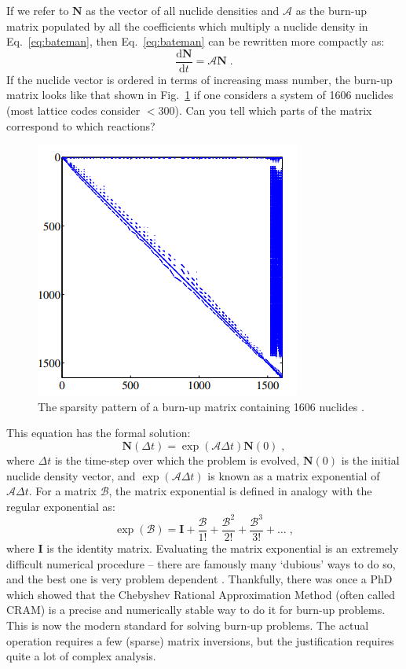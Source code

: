 \documentclass{article}
\begin{document}
If we refer to $\mathbf{N}$ as the vector of all nuclide densities and $\mathcal{A}$ as the burn-up matrix populated by all the coefficients which multiply a nuclide density in Eq.~\eqref{eq:bateman}, then Eq.~\eqref{eq:bateman} can be rewritten more compactly as:
\begin{equation}
    \frac{\mathrm{d}\mathbf{N}}{\mathrm{d}t} = \mathcal{A}\mathbf{N}\;\mathrm{.}
\end{equation}
If the nuclide vector is ordered in terms of increasing mass number, the burn-up matrix looks like that shown in Fig.~\ref{fig:matrix} if one considers a system of 1606 nuclides (most lattice codes consider $<$300). Can you tell which parts of the matrix correspond to which reactions? 

\begin{figure}[h!]
	\centering
	\includegraphics[scale=0.95]{./images/burnup_sparsity.png} 
	\caption{The sparsity pattern of a burn-up matrix containing 1606 nuclides \cite{Pusa}.} 
	\label{fig:matrix}
\end{figure}

This equation has the formal solution:
\begin{equation}
    \mathbf{N}(\Delta t) = \exp\left(\mathcal{A}\Delta t\right)\mathbf{N}(0)\;\mathrm{,}
\end{equation}
where $\Delta t$ is the time-step over which the problem is evolved, $\mathbf{N}(0)$ is the initial nuclide density vector, and $\exp\left(\mathcal{A}\Delta t\right)$ is known as a matrix exponential of $\mathcal{A}\Delta t$. For a matrix $\mathcal{B}$, the matrix exponential is defined in analogy with the regular exponential as:
\begin{equation}
    \exp\left(\mathcal{B}\right) = \mathbf{I} + \frac{\mathcal{B}}{1!} + \frac{\mathcal{B}^2}{2!} + \frac{\mathcal{B}^3}{3!}+\ldots\;\mathrm{,}
\end{equation}
where $\mathbf{I}$ is the identity matrix. Evaluating the matrix exponential is an extremely difficult numerical procedure -- there are famously many `dubious' ways to do so, and the best one is very problem dependent \cite{Moler}. Thankfully, there was once a PhD which showed that the Chebyshev Rational Approximation Method (often called CRAM) is a precise and numerically stable way to do it for burn-up problems. This is now the modern standard for solving burn-up problems. The actual operation requires a few (sparse) matrix inversions, but the justification requires quite a lot of complex analysis.
\end{document}
